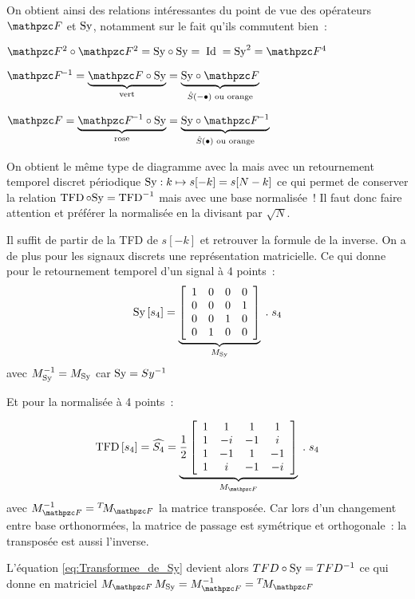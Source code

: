 On obtient ainsi des relations intéressantes du point de vue des
opérateurs $\F$ et $\mathrm{Sy}$, notamment sur le fait qu'ils commutent
bien~:
\begin{description}
\item $\F^2\circ\F^2 = \Sy\circ\Sy =\; \Id \; = \Sy^2 = \F^4$
\item $\Finv = \caCest{\F\circ\Sy}{\text{vert}} = \caCest{\Sy\circ\F}{\hat{S}\p{-\bullet}\text{ ou orange}}$
\item $\F = \caCest{\Finv\circ\Sy}{\text{rose}} = \caCest{\Sy\circ\Finv}{\hat{S}\p{\bullet}\text{ ou orange}}$
\end{description}
\begin{remarque} 
  
  On obtient le même type de diagramme avec la \TFD{} mais avec un
  retournement temporel discret périodique
  $\mathrm{Sy} : k \mapsto s[-k]= s[N-k]$ ce qui permet de conserver la
  relation $\mathop{\mathrm{TFD}}\circ\mathrm{Sy}=\mathop{\mathrm{TFD}}^{-1}$ mais avec une base normalisée~!
  Il faut donc faire attention et préférer la \TFD{} normalisée en la
  divisant par $\sqrt{N}$.
  
  Il suffit de partir de la TFD de $s[-k]$ et retrouver la formule de
  la \TFD{} inverse. On a de plus pour les signaux discrets une
  représentation matricielle. Ce qui donne pour le retournement
  temporel d'un signal à 4 points~:
  \begin{equation}
    \label{eq:sy_matriciel}
    \mathrm{Sy}\left[s_4\right] = \underbrace{
      \left[
        \begin{array}{cccc}
          1 & 0 & 0 & 0\\
          0 & 0 & 0 & 1\\
          0 & 0 & 1 & 0\\
          0 & 1 & 0 & 0
        \end{array}\right]}_{M_{\mathrm{Sy}}}\;.\;s_4
  \end{equation}
  avec $M_{\mathrm{Sy}}^{-1}=M_{\mathrm{Sy}}$ car $\mathrm{Sy}=Sy^{-1}$
      
  Et pour la \TFD{} normalisée à 4 points~:
  
  \begin{equation}
    \label{eq:tfd4_matriciel}
    \mTFD\b{s_4} = \widehat{S_4} = \caCest{
      \frac{1}{2}\left[
        \begin{array}{cccc}
          1 & 1 & 1 & 1\\
          1 & -i & -1 & i\\
          1 & -1 & 1 & -1\\
          1 & i & -1 & -i
        \end{array}
      \right]}{M_{\F}}\;.\;s_4
  \end{equation}
  avec $M_{\F}^{-1}=\Tr{M_{\F}}$ la matrice transposée. Car lors d'un
  changement entre base orthonormées, la matrice de passage est
  symétrique et orthogonale~: la transposée est aussi l'inverse.
  
  
  L'équation \eqref{eq:Transformee_de_Sy} devient alors
  $TFD\circ\mathrm{Sy} = TFD{}^{-1}$ ce qui donne en matriciel
  $M_{\F}\,M_{\Sy} = M_{\F}^{-1} = \Tr{M_{\F}} $
\end{remarque}

